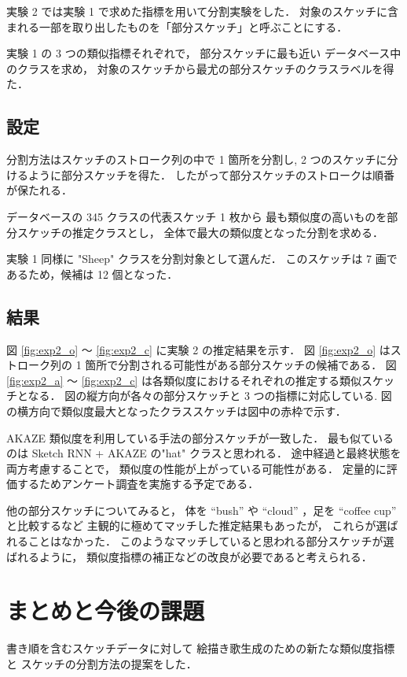 \documentclass[twocolumn]{jarticle}     %
\begin{document}
実験 2 では実験 1 で求めた指標を用いて分割実験をした．
対象のスケッチに含まれる一部を取り出したものを「部分スケッチ」と呼ぶことにする．

実験 1 の 3 つの類似指標それぞれで，
部分スケッチに最も近い データベース中のクラスを求め，
対象のスケッチから最尤の部分スケッチのクラスラベルを得た．


\subsection{設定}
分割方法はスケッチのストローク列の中で 1 箇所を分割し, 2 つのスケッチに分けるように部分スケッチを得た．
したがって部分スケッチのストロークは順番が保たれる．

データベースの 345 クラスの代表スケッチ 1 枚から
最も類似度の高いものを部分スケッチの推定クラスとし，
全体で最大の類似度となった分割を求める．

実験 1 同様に "Sheep" クラスを分割対象として選んだ．
このスケッチは 7 画であるため，候補は 12 個となった．

\subsection{結果}

図 \ref{fig:exp2_o} ～ \ref{fig:exp2_c} に実験 2 の推定結果を示す．
図 \ref{fig:exp2_o} はストローク列の 1 箇所で分割される可能性がある部分スケッチの候補である．
図 \ref{fig:exp2_a} ～ \ref{fig:exp2_c} は各類似度におけるそれぞれの推定する類似スケッチとなる．
図の縦方向が各々の部分スケッチと 3 つの指標に対応している.
図の横方向で類似度最大となったクラススケッチは図中の赤枠で示す．


AKAZE 類似度を利用している手法の部分スケッチが一致した．
最も似ているのは Sketch RNN + AKAZE の"hat" クラスと思われる．
途中経過と最終状態を両方考慮することで，
類似度の性能が上がっている可能性がある．
定量的に評価するためアンケート調査を実施する予定である．

他の部分スケッチについてみると，
体を “bush” や “cloud” ，足を “coffee cup” と比較するなど
主観的に極めてマッチした推定結果もあったが，
これらが選ばれることはなかった．
このようなマッチしていると思われる部分スケッチが選ばれるように，
類似度指標の補正などの改良が必要であると考えられる．


\section{まとめと今後の課題}

書き順を含むスケッチデータに対して
絵描き歌生成のための新たな類似度指標と
スケッチの分割方法の提案をした．
\end{document}
